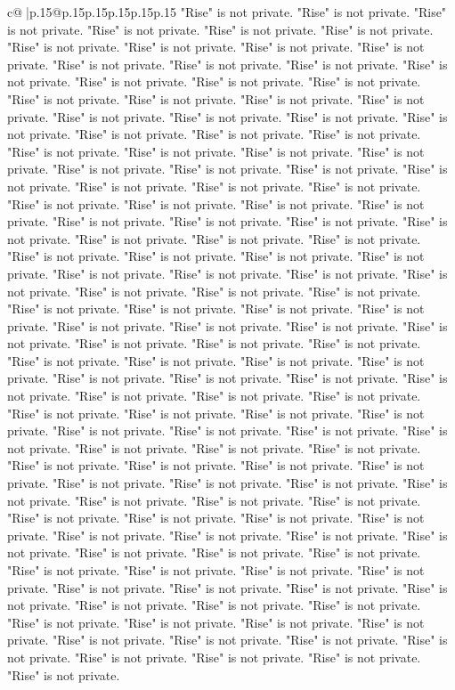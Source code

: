 \documentclass{article}
\begin{document}
{\begin{supertabular}{c@{$\;$}|p{.15\linewidth}@{}p{.15\linewidth}p{.15\linewidth}p{.15\linewidth}p{.15\linewidth}p{.15\linewidth}}
{{{"Rise" is not private. "Rise" is not private. "Rise" is not private. "Rise" is not private. "Rise" is not private. "Rise" is not private. "Rise" is not private. "Rise" is not private. "Rise" is not private. "Rise" is not private. "Rise" is not private. "Rise" is not private. "Rise" is not private. "Rise" is not private. "Rise" is not private. "Rise" is not private. "Rise" is not private. "Rise" is not private. "Rise" is not private. "Rise" is not private. "Rise" is not private. "Rise" is not private. "Rise" is not private. "Rise" is not private. "Rise" is not private. "Rise" is not private. "Rise" is not private. "Rise" is not private. "Rise" is not private. "Rise" is not private. "Rise" is not private. "Rise" is not private. "Rise" is not private. "Rise" is not private. "Rise" is not private. "Rise" is not private. "Rise" is not private. "Rise" is not private. "Rise" is not private. "Rise" is not private. "Rise" is not private. "Rise" is not private. "Rise" is not private. "Rise" is not private. "Rise" is not private. "Rise" is not private. "Rise" is not private. "Rise" is not private. "Rise" is not private. "Rise" is not private. "Rise" is not private. "Rise" is not private. "Rise" is not private. "Rise" is not private. "Rise" is not private. "Rise" is not private. "Rise" is not private. "Rise" is not private. "Rise" is not private. "Rise" is not private. "Rise" is not private. "Rise" is not private. "Rise" is not private. "Rise" is not private. "Rise" is not private. "Rise" is not private. "Rise" is not private. "Rise" is not private. "Rise" is not private. "Rise" is not private. "Rise" is not private. "Rise" is not private. "Rise" is not private. "Rise" is not private. "Rise" is not private. "Rise" is not private. "Rise" is not private. "Rise" is not private. "Rise" is not private. "Rise" is not private. "Rise" is not private. "Rise" is not private. "Rise" is not private. "Rise" is not private. "Rise" is not private. "Rise" is not private. "Rise" is not private. "Rise" is not private. "Rise" is not private. "Rise" is not private. "Rise" is not private. "Rise" is not private. "Rise" is not private. "Rise" is not private. "Rise" is not private. "Rise" is not private. "Rise" is not private. "Rise" is not private. "Rise" is not private. "Rise" is not private. "Rise" is not private. "Rise" is not private. "Rise" is not private. "Rise" is not private. "Rise" is not private. "Rise" is not private. "Rise" is not private. "Rise" is not private. "Rise" is not private. "Rise" is not private. "Rise" is not private. "Rise" is not private. "Rise" is not private. "Rise" is not private. "Rise" is not private. "Rise" is not private. "Rise" is not private. "Rise" is not private. "Rise" is not private. "Rise" is not private. "Rise" is not private. "Rise" is not private. "Rise" is not private. "Rise" is not private. "Rise" is not private. "Rise" is not private. "Rise" is not private. "Rise" is not private. "Rise" is not private. "Rise" is not private. "Rise" is not private. "Rise" is not private. "Rise" is not private. "Rise" is not private. "Rise" is not private. "Rise" is not private. "Rise" is not private. "Rise" is not private. "Rise" is not private. }}}
\end{supertabular}}
\end{document}
